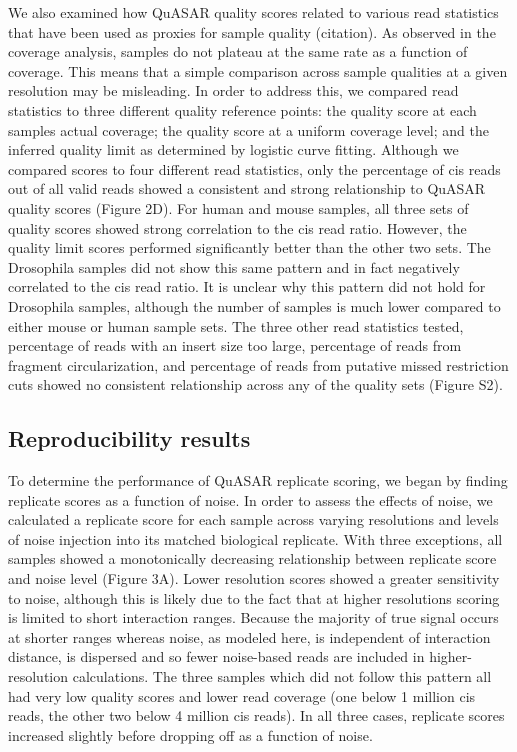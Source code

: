 We also examined how QuASAR quality scores related to various read statistics that have been used as proxies for sample quality (citation). As observed in the coverage analysis, samples do not plateau at the same rate as a function of coverage. This means that a simple comparison across sample qualities at a given resolution may be misleading. In order to address this, we compared read statistics to three different quality reference points: the quality score at each samples actual coverage; the quality score at a uniform coverage level; and the inferred quality limit as determined by logistic curve fitting. Although we compared scores to four different read statistics, only the percentage of cis reads out of all valid reads showed a consistent and strong relationship to QuASAR quality scores (Figure 2D). For human and mouse samples, all three sets of quality scores showed strong correlation to the cis read ratio. However, the quality limit scores performed significantly better than the other two sets. The Drosophila samples did not show this same pattern and in fact negatively correlated to the cis read ratio. It is unclear why this pattern did not hold for Drosophila samples, although the number of samples is much lower compared to either mouse or human sample sets. The three other read statistics tested, percentage of reads with an insert size too large, percentage of reads from fragment circularization, and percentage of reads from putative missed restriction cuts showed no consistent relationship across any of the quality sets (Figure S2).

\subsection{Reproducibility results}

To determine the performance of QuASAR replicate scoring, we began by finding replicate scores as a function of noise. In order to assess the effects of noise, we calculated a replicate score for each sample across varying resolutions and levels of noise injection into its matched biological replicate. With three exceptions, all samples showed a monotonically decreasing relationship between replicate score and noise level (Figure 3A). Lower resolution scores showed a greater sensitivity to noise, although this is likely due to the fact that at higher resolutions scoring is limited to short interaction ranges. Because the majority of true signal occurs at shorter ranges whereas noise, as modeled here, is independent of interaction distance, is dispersed and so fewer noise-based reads are included in higher-resolution calculations. The three samples which did not follow this pattern all had very low quality scores and lower read coverage (one below 1 million cis reads, the other two below 4 million cis reads). In all three cases, replicate scores increased slightly before dropping off as a function of noise.


